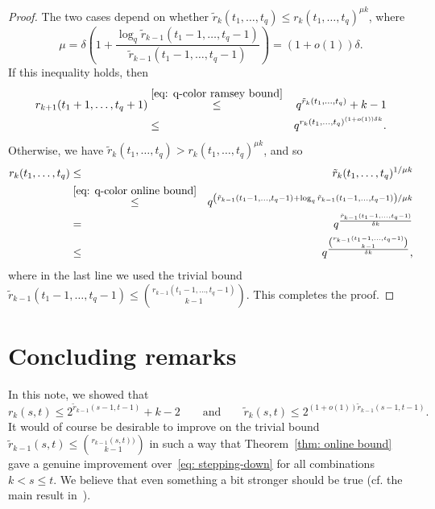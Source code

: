 \documentclass[A4paper,reqno,oneside,12pt]{amsart}
\theoremstyle{plain}
\theoremstyle{definition}
\begin{document}
\begin{proof}
    The two cases depend on whether $\tilde{r}_k(t_1, \dots, t_q) \leq r_k(t_1, \dots, t_q)^{\mu k}$, where
    \[\mu=\delta\left(1+\frac{\log_q \tilde{r}_{k-1}(t_1-1, \dots, t_q-1)}{\tilde{r}_{k-1}(t_1-1, \dots, t_q-1)}\right)=(1+o(1))\delta.\]
    If this inequality holds, then
    \begin{eqnarray*}
        r_{k+1}(t_1+1, \dots, t_q+1) 
        &\stackrel{\eqref{eq: q-color ramsey bound}}{\leq}& q^{\tilde{r}_k(t_1, \dots, t_q)} + k-1\\
        &\leq& q^{r_k(t_1, \dots, t_q)^{(1+o(1))\delta k} }.
    \end{eqnarray*}
    Otherwise, we have $\tilde{r}_k(t_1, \dots, t_q) > r_k(t_1, \dots, t_q)^{\mu k}$, and so
    \begin{eqnarray*}
        r_k(t_1, \dots, t_q) 
        &\leq& \tilde{r}_k(t_1, \dots, t_q)^{1/\mu k}\\
        &\stackrel{\eqref{eq: q-color online bound}}{\leq}& q^{\left(\tilde{r}_{k-1}(t_1-1, \dots, t_q-1)+\log_q \tilde{r}_{k-1}(t_1-1, \dots, t_q-1)\right)/\mu k}\\
        &=& q^{\frac{\tilde{r}_{k-1}(t_1-1, \dots, t_q-1)}{\delta k}}\\
        &\leq& q^{\frac{\binom{r_{k-1}(t_1-1,\ldots,t_q-1)}{k-1}}{\delta k}},
    \end{eqnarray*}
    where in the last line we used the trivial bound $\tilde{r}_{k-1}(t_1-1, \dots, t_q-1) \leq \binom{r_{k-1}(t_1-1,\ldots,t_q-1)}{k-1}$.
    This completes the proof.
\end{proof}


\section{Concluding remarks}
\label{section: conclusion}

In this note, we showed that
\begin{equation*}
    r_k(s,t) \leq 2^{\tilde{r}_{k-1}(s-1,t-1)} + k - 2
    \qquad
    \text{and}
    \qquad
    \tilde{r}_k(s,t) \leq 2^{(1+o(1))\tilde{r}_{k-1}(s-1,t-1)}.
\end{equation*}
It would of course be desirable to improve on the trivial bound $\tilde{r}_{k-1}(s,t) \leq \binom{r_{k-1}(s,t))}{k-1}$ in such a way that %
Theorem~\ref{thm: online bound} gave a genuine improvement over~\eqref{eq: stepping-down} for all combinations $k < s \leq t$.
We believe that even something a bit stronger should be true (cf. the main result in~\cite{C09}).
\end{document}
